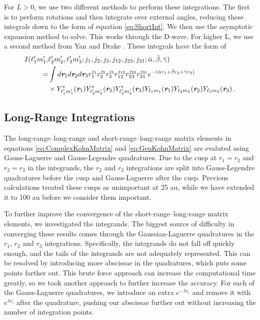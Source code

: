 \documentclass[preprint,showpacs,preprintnumbers,amsmath,amssymb]{revtex4}
\begin{document}
For $L > 0$, we use two different methods to perform these integrations. The first is to perform rotations and then integrate over external angles, reducing these integrals down to the form of equation \ref{eq:ShortInt}. We then use the asymptotic expansion method to solve. This works through the D-wave. For higher L, we use a second method from Yan and Drake \cite{Yan1997}. These integrals have the form of
\begin{align}
\label{eq:ShortIntGen}
\nonumber I(\ell_1^\prime m_1^\prime, & \ell_2^\prime m_2^\prime, \ell_3^\prime m_3^\prime; j_1,j_2,j_3,j_{12},j_{23},j_{31}; \bar{\alpha}, \bar{\beta}, \bar{\gamma}) \\
\nonumber = & \int
d \textit{\textbf{r}}_1 d \textit{\textbf{r}}_2 d \textit{\textbf{r}}_3
r_1^{j_1} r_2^{j_2} r_3^{j_3} r_{12}^{j_{12}}
r_{23}^{j_{23}} r_{31}^{j_{31}}
e^{-(\bar{\alpha} r_1 + \bar{\beta} r_2 + \bar{\gamma} r_3)} \\
& \times Y_{\ell_1^\prime m_1^\prime}^* (\textit{\textbf{r}}_1) Y_{\ell_2^\prime m_2^\prime}^* (\textit{\textbf{r}}_2) Y_{\ell_3^\prime m_3^\prime}^* (\textit{\textbf{r}}_3)
Y_{\ell_1 m_1} (\textit{\textbf{r}}_1) Y_{\ell_2 m_2} (\textit{\textbf{r}}_2) Y_{\ell_3 m_3} (\textit{\textbf{r}}_3)\, .
\end{align}

\subsection{Long-Range Integrations}
\label{sec:LongInt}
The long-range--long-range and short-range--long-range matrix elements in equations \ref{eq:ComplexKohnMatrix} and \ref{eq:GenKohnMatrix} are evaluted using Gauss-Laguerre and Gauss-Legendre quadratures. Due to the cusp at $r_1 = r_2$ and $r_2 = r_3$ in the integrands, the $r_2$ and $r_3$ integrations are split into Gauss-Legendre quadratures before the cusp and Gauss-Laguerre after the cusp.  Previous calculations \cite{VanReeth2003,VanReeth2004} treated these cusps as unimportant at 25 au, while we have extended it to 100 au before we consider them important.

To further improve the convergence of the short-range--long-range matrix elements, we investigated the integrands. The biggest source of difficulty in converging these results comes through the Gaussian-Laguerre quadratures in the $r_1$, $r_2$ and $r_3$ integrations. Specifically, the integrands do not fall off quickly enough, and the tails of the integrands are not adequately represented. This can be resolved by introducing more abscissae in the quadratures, which puts some points farther out. This brute force approach can increase the computational time greatly, so we took another approach to further increase the accuracy. For each of the Gauss-Laguerre quadratures, we introduce an extra $e^{-\lambda r_i}$ and remove it with $e^{\lambda r_i}$ after the quadrature, pushing our abscissae further out without increasing the number of integration points.
\end{document}
